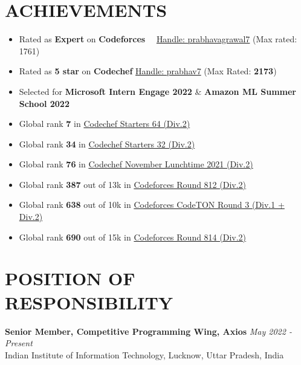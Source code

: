 \documentclass[12pt]{article}
\begin{document}
\section*{ACHIEVEMENTS}
\begin{itemize}[leftmargin=*, topsep=1pt, itemsep=1pt, partopsep=1pt, parsep=2pt]
	\item Rated as \textbf{Expert} on \textbf{Codeforces} ~~\href{https://codeforces.com/profile/prabhavagrawal7}{Handle: prabhavagrawal7} (Max rated: 1761)
	\item Rated as \textbf{5 star} on \textbf{Codechef}  \href{https://www.codechef.com/users/prabhav7}{Handle: prabhav7} (Max Rated: \textbf{2173})
	\item Selected for \textbf{Microsoft Intern Engage 2022} \& \textbf{Amazon ML Summer School 2022}
	\item Global rank \textbf{7} in \href{https://www.codechef.com/rankings/START64B?search=prabhav7}{Codechef Starters 64 (Div.2)}
	\item Global rank \textbf{34} in \href{https://www.codechef.com/rankings/START32B?search=prabhav7}{Codechef Starters 32 (Div.2)}
	\item Global rank \textbf{76} in \href{https://www.codechef.com/rankings/LTIME102B?search=prabhav7}{Codechef November Lunchtime 2021 (Div.2)}
	\item Global rank \textbf{387} out of 13k in \href{https://codeforces.com/contest/1713/standings/participant/137877142#p137877142}{Codeforces Round 812 (Div.2)}
	\item Global rank \textbf{638} out of 10k in \href{https://codeforces.com/contest/1750/standings/participant/143636092#p143636092}{Codeforces CodeTON Round 3 (Div.1 + Div.2)}
	\item Global rank \textbf{690} out of 15k in \href{https://codeforces.com/contest/1719/standings/participant/138512906#p138512906}{Codeforces Round 814 (Div.2)}
\end{itemize}

\section*{POSITION OF RESPONSIBILITY}
\textbf{Senior Member, Competitive Programming Wing, Axios} \hfill \textit{May 2022 - Present} \\
Indian Institute of Information Technology, Lucknow, Uttar Pradesh, India

\end{document}
